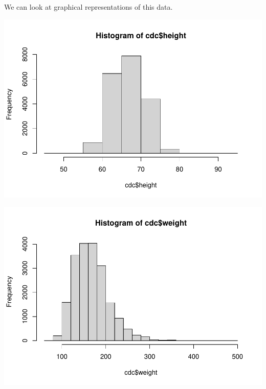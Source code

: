 \documentclass[
]{book}
\newenvironment{Shaded}{\begin{snugshade}}{\end{snugshade}}
\newcommand{\KeywordTok}[1]{\textcolor[rgb]{0.13,0.29,0.53}{\textbf{#1}}}
\newcommand{\NormalTok}[1]{#1}
\newcommand{\OperatorTok}[1]{\textcolor[rgb]{0.81,0.36,0.00}{\textbf{#1}}}
\begin{document}
We can look at graphical representations of this data.

\begin{Shaded}
\end{Shaded}

\includegraphics{_main_files/figure-latex/unnamed-chunk-127-1.pdf}

\begin{Shaded}
\end{Shaded}

\includegraphics{_main_files/figure-latex/unnamed-chunk-127-2.pdf}
\end{document}
